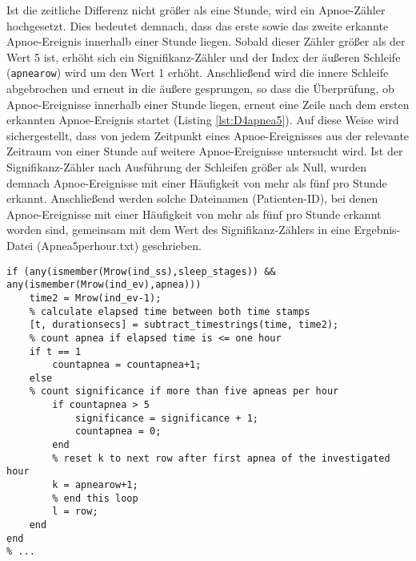 Ist die zeitliche Differenz nicht größer als eine Stunde, wird ein Apnoe-Zähler hochgesetzt. Dies bedeutet demnach, dass das erste sowie das zweite erkannte Apnoe-Ereignis innerhalb einer Stunde liegen. Sobald dieser Zähler größer als der Wert 5 ist, erhöht sich ein Signifikanz-Zähler und der Index der äußeren Schleife (\texttt{apnearow}) wird um den Wert 1 erhöht. Anschließend wird die innere Schleife abgebrochen und erneut in die äußere gesprungen, so dass die Überprüfung, ob Apnoe-Ereignisse innerhalb einer Stunde liegen, erneut eine Zeile nach dem ersten erkannten Apnoe-Ereignis startet (Listing \ref{lst:D4apnea5}). Auf diese Weise wird sichergestellt, dass von jedem Zeitpunkt eines Apnoe-Ereignisses aus der relevante Zeitraum von einer Stunde auf weitere Apnoe-Ereignisse untersucht wird. Ist der Signifikanz-Zähler nach Ausführung der Schleifen größer als Null, wurden demnach Apnoe-Ereignisse mit einer Häufigkeit von mehr als fünf pro Stunde erkannt. Anschließend werden solche Dateinamen (Patienten-ID), bei denen Apnoe-Ereignisse mit einer Häufigkeit von mehr als fünf pro Stunde erkannt worden sind, gemeinsam mit dem Wert des Signifikanz-Zählers in eine Ergebnis-Datei (Apnea5perhour.txt) geschrieben.\\

\begin{lstlisting}[caption={Implementierung Kriterium D4 in Skript ma\_check\_apneas5.m}, label={lst:D4apnea5}]
% ...
if (any(ismember(Mrow(ind_ss),sleep_stages)) && any(ismember(Mrow(ind_ev),apnea)))
    time2 = Mrow(ind_ev-1);
    % calculate elapsed time between both time stamps
    [t, durationsecs] = subtract_timestrings(time, time2);
    % count apnea if elapsed time is <= one hour
    if t == 1
        countapnea = countapnea+1;
    else
    % count significance if more than five apneas per hour
        if countapnea > 5
            significance = significance + 1;
            countapnea = 0;
        end
        % reset k to next row after first apnea of the investigated hour
        k = apnearow+1;
        % end this loop
        l = row;
    end
end
% ...
\end{lstlisting}

